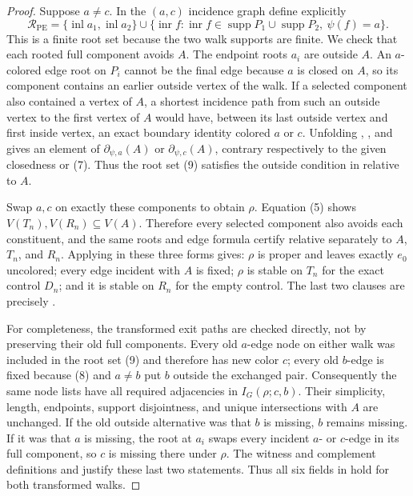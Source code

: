 \begin{proof}
Suppose $a\ne c$.  In the $(a,c)$ incidence graph define explicitly
\[
 \mathcal R_{\mathrm{PE}}=
 \{\operatorname{inl}a_1,\operatorname{inl}a_2\}
 \mathbin\cup
 \{\operatorname{inr}f: \operatorname{inr}f\in
       \operatorname{supp}P_1\cup\operatorname{supp}P_2,
       \ \psi(f)=a\}.                               \tag{9}
\]
This is a finite root set because the two walk supports are finite.  We
check that each rooted full component avoids $A$.  The endpoint roots
$a_i$ are outside $A$.
An $a$-colored edge root on $P_i$ cannot be the final edge because $a$ is
closed on $A$, so its component contains an earlier outside vertex of
the walk.  If a selected component also contained a vertex of $A$, a
shortest incidence path from such an outside vertex to the first vertex
of $A$ would have, between its last outside vertex and first inside
vertex, an exact boundary identity colored $a$ or $c$.  Unfolding
, , and
 gives an element of
$\partial_{\psi,a}(A)$ or $\partial_{\psi,c}(A)$, contrary respectively
to the given closedness or (7).  Thus the root set (9) satisfies the outside
condition in  relative to $A$.

Swap $a,c$ on exactly these components to obtain $\rho$.  Equation (5)
shows $V(T_n),V(R_n)\subseteq V(A)$.  Therefore every selected component
also avoids each constituent, and the same roots and edge formula certify
 relative separately to $A$, $T_n$, and
$R_n$.  Applying  in these three
forms gives: $\rho$ is proper and leaves exactly $e_0$ uncolored; every
edge incident with $A$ is fixed; $\rho$ is stable on $T_n$ for the exact
control $D_n$; and it is stable on $R_n$ for the empty control.  The
last two clauses are precisely .

For completeness, the transformed exit paths are checked directly, not by
preserving their old full components.  Every old $a$-edge node on either
walk was included in the root set (9) and
therefore has new color $c$; every old $b$-edge is fixed because (8) and
$a\ne b$ put $b$ outside the exchanged pair.  Consequently the same node
lists have all required adjacencies in $I_G(\rho;c,b)$.  Their simplicity,
length, endpoints, support disjointness, and unique intersections with
$A$ are unchanged.  If the old outside alternative was that $b$ is
missing, $b$ remains missing.  If it was that $a$ is missing, the root at
$a_i$ swaps every incident $a$- or $c$-edge in its full component, so $c$
is missing there under $\rho$.  The witness and complement definitions
 and  justify these last
two statements.  Thus all six fields in  hold for
both transformed walks.


\end{proof}
